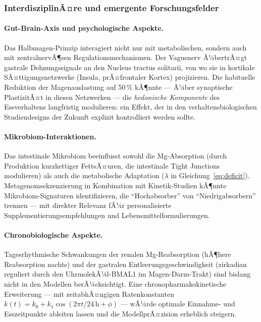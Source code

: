 ﻿\documentclass[12pt,a4paper]{article}
\theoremstyle{plain}
\theoremstyle{definition}
\theoremstyle{remark}
\begin{document}
\subsubsection{InterdisziplinÃ¤re und emergente Forschungsfelder}

\paragraph{Gut-Brain-Axis und psychologische Aspekte.}
Das Halbmagen-Prinzip interagiert nicht nur mit metabolischen, sondern
auch mit zentralnervÃ¶sen Regulationsmechanismen. Der Vagusnerv Ã¼bertrÃ¤gt
gastrale Dehnungssignale an den Nucleus tractus solitarii, von wo sie
in kortikale SÃ¤ttigungsnetzwerke (Insula, prÃ¤frontaler Kortex) projizieren.
Die habituelle Reduktion der Magenauslastung auf 50\,\% kÃ¶nnte --- Ã¼ber
synaptische PlastizitÃ¤t in diesen Netzwerken --- die \emph{hedonische
Komponente} des Essverhaltens langfristig modulieren: ein Effekt, der
in den verhaltensbiologischen Studiendesigns der Zukunft explizit
kontrolliert werden sollte.

\paragraph{Mikrobiom-Interaktionen.}
Das intestinale Mikrobiom beeinflusst sowohl die Mg-Absorption (durch
Produktion kurzkettiger FettsÃ¤uren, die intestinale Tight Junctions
modulieren) als auch die metabolische Adaptation ($\lambda$ in
Gleichung~\eqref{eq:deficit}). Metagenomsekzenzierung in Kombination
mit Kinetik-Studien kÃ¶nnte Mikrobiom-Signaturen identifizieren, die
``Hochabsorber'' von ``Niedrigabsorbern'' trennen --- mit direkter
Relevanz fÃ¼r personalisierte Supplementierungsempfehlungen und
Lebensmittelformulierungen.

\paragraph{Chronobiologische Aspekte.}
Tagesrhythmische Schwankungen der renalen Mg-Reab\-sor\-ption (hÃ¶here
Reabsorption nachts) und der gastralen Entleerungsge\-schwindigkeit
(zirkadian reguliert durch den UhrmolekÃ¼l-BMAL1 im Magen-Darm-Trakt)
sind bislang nicht in den Modellen berÃ¼cksichtigt. Eine
chronopharmakokinetische Erweiterung --- mit zeitabhÃ¤ngigen
Ratenkonstanten $k(t) = k_0 + k_1 \cos(2\pi t / 24\,\text{h} + \phi)$
--- wÃ¼rde optimale Einnahme- und Esszeitpunkte ableiten lassen und
die ModellprÃ¤zision erheblich steigern.
\end{document}
